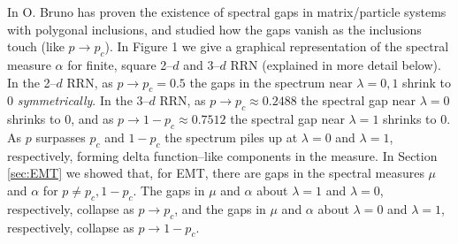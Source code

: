 \documentclass[english,12pt,jmp,graphicx]{revtex4-1}
\begin{document}
In \cite{Bruno:PRSLA-353} O. Bruno has proven the existence of
spectral gaps in matrix/particle systems with polygonal inclusions,
and studied how the gaps vanish as the inclusions touch (like
$p\to p_c$). In Figure 1 we give a graphical
representation of the spectral measure $\alpha$ for finite, square 2--$d$ and
3--$d$ RRN \cite{Golden:JoB:337} (explained in more detail below). In
the 2--$d$ RRN, as $p\to p_c=0.5$ the 
gaps in the spectrum near $\lambda=0,1$ shrink to 0 \emph{symmetrically}. In
the 3--$d$ RRN, as $p\to p_c\approx0.2488$ the spectral gap near $\lambda=0$ shrinks to
0, and as $p\to1-p_c\approx0.7512$ the spectral gap near $\lambda=1$ shrinks to 0.
As $p$ surpasses $p_c$ and $1-p_c$ the spectrum piles up at $\lambda=0$ and
$\lambda=1$, respectively, forming delta function--like components in the
measure. In Section \ref{sec:EMT} we showed that, for EMT, there are
gaps in the spectral measures $\mu$ and $\alpha$ for $p\neq p_c,1-p_c$. The gaps
in $\mu$ and $\alpha$ about $\lambda=1$ and $\lambda=0$, respectively, collapse as
$p\to p_c$, and the gaps in $\mu$ and $\alpha$ about $\lambda=0$ and $\lambda=1$,
respectively, collapse as $p\to1-p_c$. 
\end{document}
